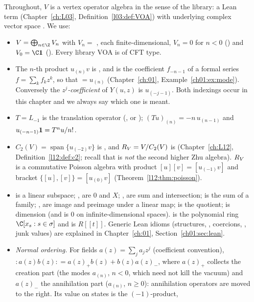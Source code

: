 Throughout, $V$ is a vertex operator algebra in the sense of the library: a Lean term
 (Chapter~\ref{ch:L03}, Definition~\ref{l03:def:VOA}) with
underlying complex vector space . We use:
\begin{itemize}
\item $V = \bigoplus_{n\in\Z}V_n$ with $V_n = $ , each finite-dimensional,
  $V_n = 0$ for $n<0$ () and $V_0 = \C\lelevenvac$ (). Every
  library VOA is of CFT type.
\item The $n$-th product $u_{(n)}v$ is , and  is the coefficient
  $f_{-n-1}$ of a formal series $f=\sum_kf_kz^k$, so that  $=u_{(n)}$
  (Chapter~\ref{ch:01}, Example~\ref{ch01:ex:mode}). Conversely the \emph{$z^j$-coefficient}
   of $Y(u,z)$ is $u_{(-j-1)}$. Both indexings occur in this chapter and we always say
  which one is meant.
\item $T = L_{-1}$ is the translation operator (, or
  ); $(Tu)_{(n)} = -n\,u_{(n-1)}$ and $u_{(-n-1)}\mathbf{1} =
  T^nu/n!$.
\item $C_2(V) = \operatorname{span}\{u_{(-2)}v\}$ is , and $R_V = V/C_2(V)$ is
   (Chapter~\ref{ch:L12}, Definition~\ref{l12:def:c2}; recall that  is
  \emph{not} the second higher Zhu algebra). $R_V$ is a commutative Poisson algebra with
  product $[u][v] = [u_{(-1)}v]$ and bracket $\{[u],[v]\} = [u_{(0)}v]$
  (Theorem~\ref{l12:thm:poisson}).
\item {} is a linear subspace; ,  are $0$ and $X$; ,
   are sum and intersection;  is the sum of a family; ,
   are image and preimage under a linear map;  is the quotient;
   is dimension (and is $0$ on infinite-dimensional spaces).  is the polynomial ring $\C[x_s : s\in\sigma]$ and  is $R[[t]]$.
  Generic Lean idioms (structures, , coercions, , junk values) are explained in
  Chapter~\ref{ch:01}, Section~\ref{ch01:sec:lean}.
\item \emph{Normal ordering.} For fields $a(z) = \sum_ja_jz^j$ (coefficient convention), ${:}a(z)b(z){:} = a(z)_+b(z)+b(z)a(z)_-$,
  where $a(z)_+$ collects the creation part (the modes $a_{(n)}$, $n<0$, which need not kill the vacuum) and $a(z)_-$ the
  annihilation part ($a_{(n)}$, $n\ge0$): annihilation operators are moved to the right. Its value on states is the $(-1)$-product,

\end{itemize}

